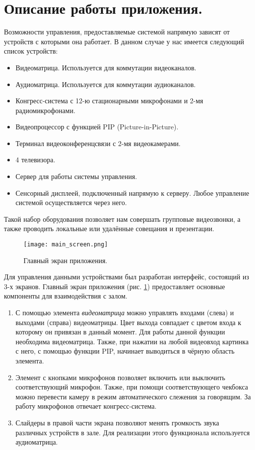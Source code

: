 \clearpage

\section{Описание работы приложения.}

Возможности управления, предоставляемые системой напрямую зависят от устройств с которыми она работает. В данном случае
у нас имеется следующий список устройств:

\begin{itemize}
    \item Видеоматрица. Используется для коммутации видеоканалов.
    \item Аудиоматрица. Используется для коммутации аудиоканалов.
    \item Конгресс-система с 12-ю стационарными микрофонами и 2-мя радиомикрофонами.
    \item Видеопроцессор с функцией PIP (Picture-in-Picture).
    \item Терминал видеоконференцсвязи с 2-мя видеокамерами.
    \item 4 телевизора.
    \item Сервер для работы системы управления.
    \item Сенсорный дисплеей, подключенный напрямую к серверу. Любое управление системой осуществляется через него.
\end{itemize}

\noindent Такой набор оборудования позволяет нам совершать групповые видеозвонки, а также проводить локальные или удалённые
совещания и презентации.

\begin{figure}[h]
    \centering
    \texttt{[image: main\_screen.png]}
    \caption{Главный экран приложения.}
    \label{fig:main_screen}
\end{figure}

\noindent Для управления данными устройствами был разработан интерфейс, состоящий из 3-х экранов. Главный экран приложения
(рис. \ref{fig:main_screen}) предоставляет основные компоненты для взаимодействия с залом.

\begin{enumerate}
    \item С помощью элемента \textit{видеоматрица} можно управлять входами (слева) и выходами (справа) видеоматрицы.
    Цвет выхода совпадает с цветом входа к которому он привязан в данный момент. Для работы данной функции необходима
    видеоматрица. Также, при нажатии на любой видеовход картинка с него, с помощью функции PIP, начинает выводиться в чёрную
    область элемента.
    \item Элемент с кнопками микрофонов позволяет включить или выключить соответствующий микрофон. Также, при помощи
    соответствующего чекбокса можно перевести камеру в режим автоматического слежения за говорящим. За работу микрофонов
    отвечает конгресс-система.
    \item Слайдеры в правой части экрана позволяют менять громкость звука различных устройств в зале. Для реализации этого
    функционала используется аудиоматрица.
\end{enumerate}

